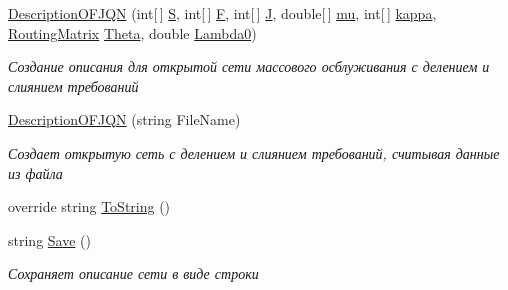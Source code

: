 \begin{DoxyCompactItemize}
\item 
\hyperlink{class_network_descriptions_1_1_description_o_f_j_q_n_aadd1179f498f004b8f0658801bdf0bd5}{Description\+O\+F\+J\+QN} (int\mbox{[}$\,$\mbox{]} \hyperlink{class_network_descriptions_1_1_description_o_f_j_q_n_a31744a17bac05c3e10a7e958ad3fdb0c}{S}, int\mbox{[}$\,$\mbox{]} \hyperlink{class_network_descriptions_1_1_description_o_f_j_q_n_aaadbe1cc3f0bdb0bef593d2b732c988f}{F}, int\mbox{[}$\,$\mbox{]} \hyperlink{class_network_descriptions_1_1_description_o_f_j_q_n_a75cf16b40e07c708c6580d331e692de0}{J}, double\mbox{[}$\,$\mbox{]} \hyperlink{class_network_descriptions_1_1_description_o_f_j_q_n_a378792ff9db7825dfeee852298fd3314}{mu}, int\mbox{[}$\,$\mbox{]} \hyperlink{class_network_descriptions_1_1_description_o_f_j_q_n_a3a88e6ce220ecbbe4a056fedc8d6595c}{kappa}, \hyperlink{class_network_descriptions_1_1_routing_matrix}{Routing\+Matrix} \hyperlink{class_network_descriptions_1_1_description_o_f_j_q_n_af8d4bf8f19a4db2daef14d0dafd77a00}{Theta}, double \hyperlink{class_network_descriptions_1_1_description_o_f_j_q_n_a0670c1d5fa5d487f7bddb667d421a85c}{Lambda0})
\begin{DoxyCompactList}\small\item\em Создание описания для открытой сети массового осблуживания с делением и слиянием требований \end{DoxyCompactList}\item 
\hyperlink{class_network_descriptions_1_1_description_o_f_j_q_n_a190f0db575be6456d18cd431c972f8c4}{Description\+O\+F\+J\+QN} (string File\+Name)
\begin{DoxyCompactList}\small\item\em Создает открытую сеть с делением и слиянием требований, считывая данные из файла \end{DoxyCompactList}\item 
override string \hyperlink{class_network_descriptions_1_1_description_o_f_j_q_n_a3c1fbc082049a10b0c75b276120062f2}{To\+String} ()
\item 
string \hyperlink{class_network_descriptions_1_1_description_o_f_j_q_n_aaf7df1f5a76c7162bedb254ecef5ad18}{Save} ()
\begin{DoxyCompactList}\small\item\em Сохраняет описание сети в виде строки \end{DoxyCompactList}\end{DoxyCompactItemize}
